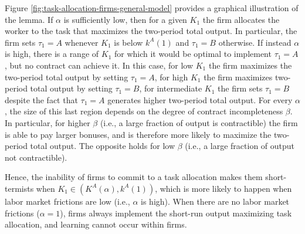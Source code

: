 \documentclass[12pt,american]{paper}
\theoremstyle{remark}
\begin{document}
%
Figure \ref{fig:task-allocation-firms-general-model}  provides a graphical illustration of the lemma. If $\alpha$ is sufficiently low, then for a given $K_1$ the firm allocates the worker to the task that maximizes the two-period total output. In particular, the firm sets $\tau_1=A$ whenever $K_1$ is below $k^A(1) $ and $\tau_1=B$ otherwise. If instead $\alpha$ is high, there is a range of $K_1$ for which it would be optimal to implement $\tau_1=A$, but no contract can achieve it. In this case, for low $K_1$ the firm maximizes the two-period total output by setting $\tau_1=A$, for high  $K_1$ the firm maximizes two-period total output by setting $\tau_1=B$, for intermediate $K_1$ the firm sets $\tau_1=B$ despite the fact that $\tau_1=A$ generates higher two-period total output. For every $\alpha$, the size of this last region depends on the degree of contract incompleteness $ \beta$. In particular, for higher  $\beta$ (i.e., a large fraction of output is contractible) the firm is able to pay larger bonuses, and is therefore more likely to maximize the two-period total output. The opposite holds for low $\beta$ (i.e., a large fraction of output not contractible).

 Hence, the inability of firms to commit to a task allocation makes them short-termists when $K_1\in(K^A(\alpha), k^A(1))$, which is more likely to happen when labor market frictions are low (i.e., $\alpha$ is high). When there are no labor market frictions ($\alpha=1$), firms always implement the short-run output maximizing task allocation, and learning cannot occur within firms.

\end{document}
